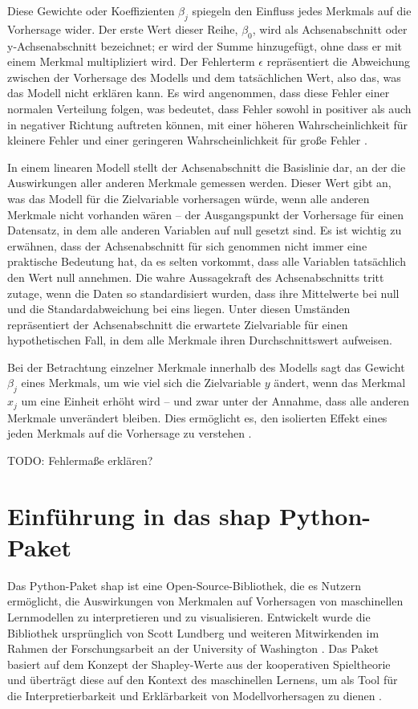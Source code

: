 Diese Gewichte oder Koeffizienten $\beta_j$ spiegeln den Einfluss jedes Merkmals auf die Vorhersage wider. 
Der erste Wert dieser Reihe, $\beta_0$, wird als Achsenabschnitt oder y-Achsenabschnitt bezeichnet; er wird der Summe hinzugefügt, 
ohne dass er mit einem Merkmal multipliziert wird. Der Fehlerterm $\epsilon$ repräsentiert die Abweichung zwischen der Vorhersage des Modells 
und dem tatsächlichen Wert, also das, was das Modell nicht erklären kann. 
Es wird angenommen, dass diese Fehler einer normalen Verteilung folgen, was bedeutet, dass Fehler sowohl in positiver als 
auch in negativer Richtung auftreten können, mit einer höheren Wahrscheinlichkeit für kleinere Fehler und einer 
geringeren Wahrscheinlichkeit für große Fehler \cite[S. 37]{Molnar_2022}.

In einem linearen Modell stellt der Achsenabschnitt die Basislinie dar, an der die Auswirkungen aller 
anderen Merkmale gemessen werden. Dieser Wert gibt an, was das Modell für die Zielvariable vorhersagen 
würde, wenn alle anderen Merkmale nicht vorhanden wären – der Ausgangspunkt der Vorhersage 
für einen Datensatz, in dem alle anderen Variablen auf null gesetzt sind. 
Es ist wichtig zu erwähnen, dass der Achsenabschnitt für sich genommen nicht immer eine praktische 
Bedeutung hat, da es selten vorkommt, dass alle Variablen tatsächlich den Wert null annehmen. 
Die wahre Aussagekraft des Achsenabschnitts tritt zutage, wenn die Daten so standardisiert wurden, 
dass ihre Mittelwerte bei null und die Standardabweichung bei eins liegen. Unter diesen Umständen repräsentiert der Achsenabschnitt 
die erwartete Zielvariable für einen hypothetischen Fall, in dem alle Merkmale ihren Durchschnittswert 
aufweisen.

Bei der Betrachtung einzelner Merkmale innerhalb des Modells sagt das Gewicht $\beta_j$ eines Merkmals, 
um wie viel sich die Zielvariable $y$ ändert, wenn das Merkmal $x_j$ um eine Einheit erhöht wird – und zwar unter 
der Annahme, dass alle anderen Merkmale unverändert bleiben. 
Dies ermöglicht es, den isolierten Effekt eines jeden Merkmals auf die Vorhersage zu verstehen \cite[S. 39]{Molnar_2022}.

TODO: Fehlermaße erklären? 

\section{Einführung in das \textsf{shap} Python-Paket}

Das Python-Paket \textsf{shap} ist eine Open-Source-Bibliothek, die es Nutzern ermöglicht, 
die Auswirkungen von Merkmalen auf Vorhersagen von maschinellen Lernmodellen zu interpretieren und zu visualisieren. 
Entwickelt wurde die Bibliothek ursprünglich von Scott Lundberg und weiteren Mitwirkenden im Rahmen der Forschungsarbeit 
an der University of Washington \cite{NIPS2017_8a20a862}. Das Paket basiert auf dem Konzept der Shapley-Werte aus der kooperativen Spieltheorie 
und überträgt diese auf den Kontext des maschinellen Lernens, um als Tool für die Interpretierbarkeit und Erklärbarkeit 
von Modellvorhersagen zu dienen \cite{shap_docs}.

